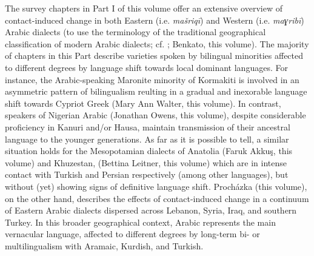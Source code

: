 \documentclass[output=paper]{langsci/langscibook}
\begin{document}
The survey chapters in Part I of this volume offer an extensive overview of contact-induced change in both Eastern (i.e. \textit{mašriqī}) and Western (i.e. \textit{maɣribī}) Arabic dialects (to use the terminology of the traditional geographical classification of modern Arabic dialects; cf. \citealt{Palva2009}; Benkato, this volume). The majority of chapters in this Part describe varieties spoken by bilingual minorities affected to different degrees by language shift towards local dominant languages. For instance, the Arabic-speaking Maronite minority of Kormakiti is involved in an asymmetric pattern of bilingualism reulting in a gradual and inexorable language shift towards Cypriot Greek (Mary Ann Walter, this volume). In contrast, speakers of Nigerian Arabic (Jonathan Owens, this volume), despite considerable proficiency in Kanuri and/or Hausa, maintain transmission of their ancestral language to the younger generations. As far as it is possible to tell, a similar situation holds for the Mesopotamian dialects of Anatolia (Faruk Akkuş, this volume) and Khuzestan, (Bettina Leitner, this volume) which are in intense contact with Turkish and Persian respectively (among other languages), but without (yet) showing signs of definitive language shift. Procházka (this volume), on the other hand, describes the effects of contact-induced change in a continuum of Eastern Arabic dialects dispersed across Lebanon, Syria, Iraq, and southern Turkey. In this broader geographical context, Arabic represents the main vernacular language, affected to different degrees by long-term bi- or multilingualism with Aramaic, Kurdish, and Turkish.
\end{document}

